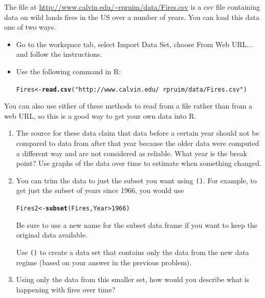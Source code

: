 \documentclass[twoside]{book}\usepackage[]{graphicx}\usepackage[]{xcolor}
\makeatletter
\newcommand{\hlnum}[1]{\textcolor[rgb]{0.686,0.059,0.569}{#1}}%
\newcommand{\hlstr}[1]{\textcolor[rgb]{0.192,0.494,0.8}{#1}}%
\newcommand{\hlopt}[1]{\textcolor[rgb]{0,0,0}{#1}}%
\newcommand{\hlstd}[1]{\textcolor[rgb]{0.345,0.345,0.345}{#1}}%
\newcommand{\hlkwb}[1]{\textcolor[rgb]{0.69,0.353,0.396}{#1}}%
\newcommand{\hlkwd}[1]{\textcolor[rgb]{0.737,0.353,0.396}{\textbf{#1}}}%
\newenvironment{kframe}{%
 \def\at@end@of@kframe{}%
 \ifinner\ifhmode%
  \def\at@end@of@kframe{\end{minipage}}%
  \begin{minipage}{\columnwidth}%
 \fi\fi%
 \def\FrameCommand##1{\hskip\@totalleftmargin \hskip-\fboxsep
 \colorbox{shadecolor}{##1}\hskip-\fboxsep
     \hskip-\linewidth \hskip-\@totalleftmargin \hskip\columnwidth}%
 \MakeFramed {\advance\hsize-\width
   \@totalleftmargin\z@ \linewidth\hsize
   \@setminipage}}%
 {\par\unskip\endMakeFramed%
 \at@end@of@kframe}
\newenvironment{knitrout}{}{} %
\newcommand{\Rindex}[1]{\index{\texttt{#1}}}
\newcommand{\function}[1]{{\color{purple!75!blue}\texttt{\StrSubstitute{#1}{()}{}()}}\Rindex{#1}}
\def\R{{\sf R}}
\def\tab#1{{\sf #1}}
\newcounter{example}[section]
\makeatother
\begin{document}
\begin{problem}The file at \url{http://www.calvin.edu/~rpruim/data/Fires.csv}
	is a csv file containing data on wild lands fires in the US over a number of years.
You can load this data one of two ways.
\begin{itemize}
	\item
		Go to the workspace tab, select \tab{Import Data Set}, choose \tab{From Web URL...}
		and follow the instructions.
	\item
		Use the following command in \R:
\begin{knitrout}
\color{fgcolor}\begin{kframe}
\begin{alltt}
\hlstd{Fires} \hlkwb{<-} \hlkwd{read.csv}\hlstd{(}\hlstr{"http://www.calvin.edu/~rpruim/data/Fires.csv"}\hlstd{)}
\end{alltt}
\end{kframe}
\end{knitrout}
\end{itemize}
You can also use either of these methods to read from a file rather than from a
web URL, so this is a good way to get your own data into \R.
\begin{enumerate}
	\item
		The source for these data claim that data before a certain year should not be compared
		to data from after that year because the older data were computed a different way and
		are not considered as reliable.  What year is the break point?  Use graphs of the data 
		over time to estimate when something changed.
	\item
		You can trim the data to just the subset you want using \function{subset()}.  For 
		example, to get just the subset of years since 1966, you would use
\begin{knitrout}
\color{fgcolor}\begin{kframe}
\begin{alltt}
\hlstd{Fires2} \hlkwb{<-} \hlkwd{subset}\hlstd{(Fires, Year} \hlopt{>} \hlnum{1966}\hlstd{)}
\end{alltt}
\end{kframe}
\end{knitrout}
		Be sure to use a new name for the subset data frame if you want to keep the original data available.

		Use \function{subset()} to create a data set that contains only the data from the new data regime (based on your answer in the previous problem).
	\item
		Using only the data from this smaller set, how would you describe what is happening with 
		fires over time?
\end{enumerate}
\end{problem}
\end{document}
